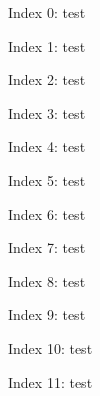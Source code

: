 \documentclass{article}
\begin{document}
Index 0: {\avenir test}

Index 1: {\avenirI test}

Index 2: {\avenirII test}

Index 3: {\avenirIII test}

Index 4: {\avenirIV test}

Index 5: {\avenirV test}

Index 6: {\avenirVI test}

Index 7: {\avenirVII test}

Index 8: {\avenirVIII test}

Index 9: {\avenirIX test}

Index 10: {\avenirX test}

Index 11: {\avenirXI test}
\end{document}

